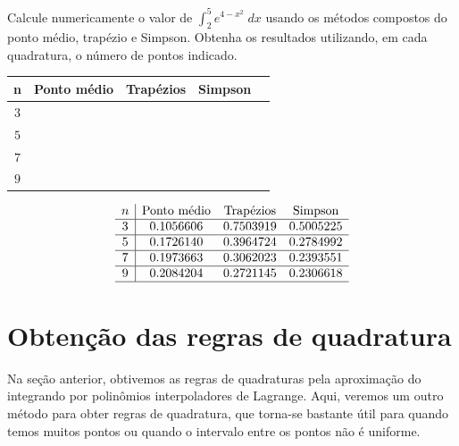\begin{exer}
Calcule numericamente o valor de $\int_2^5e^{4-x^2}\;dx$ usando os métodos compostos do ponto médio, trapézio e Simpson. Obtenha os resultados utilizando, em cada quadratura, o número de pontos indicado.
\begin{center}
\begin{tabular}{|c|c|c|c|c|}
\hline
n   & Ponto médio & Trapézios & Simpson \\
\hline
$3$ &~\hspace{40pt}~& ~\hspace{40pt}~& ~\hspace{40pt}\\
\hline
$5 $ & & & \\
\hline
$7 $ & & &\\
\hline
$9$  & & &\\
\hline
\end{tabular}
\end{center}
\end{exer}
\begin{resp}

    \begin{equation*}
    \begin{array}{c|cccc}
        n   & \text{Ponto médio} & \text{Trapézios} & \text{Simpson} \\  \hline
        3 & 0.1056606  &  0.7503919  &  0.5005225  \\  \hline
        5 & 0.1726140 &   0.3964724  &  0.2784992   \\\hline
        7 & 0.1973663 &   0.3062023  &  0.2393551  \\ \hline
        9  &  0.2084204 &   0.2721145  &  0.2306618  \\ \hline
    \end{array}
    \end{equation*}

\end{resp}



\section{Obtenção das regras de quadratura}

Na seção anterior, obtivemos as regras de quadraturas pela aproximação do integrando por polinômios interpoladores de Lagrange. Aqui, veremos um outro método para obter regras de quadratura, que torna-se bastante útil para quando temos muitos pontos ou quando o intervalo entre os pontos não é uniforme.

